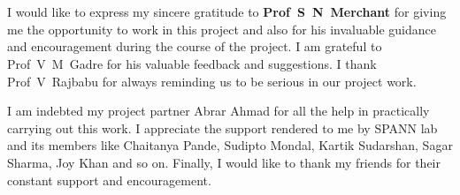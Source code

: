 \chapter*{}
I would like to express my sincere gratitude to \textbf{Prof~S~N~Merchant}
for giving me the opportunity to work in this project and also for his
invaluable guidance and encouragement during the course of the project. I am
grateful to Prof~V~M~Gadre for his valuable feedback and suggestions. I thank
Prof~V~Rajbabu for always reminding us to be serious in our project work.

I am indebted my project partner Abrar Ahmad 
for all the help in practically carrying out this work. I appreciate the 
support rendered to me by SPANN lab and its members like Chaitanya Pande, 
Sudipto Mondal, Kartik Sudarshan, Sagar Sharma, Joy Khan and so on. Finally,
I would like to thank my friends for their constant support and
encouragement.
